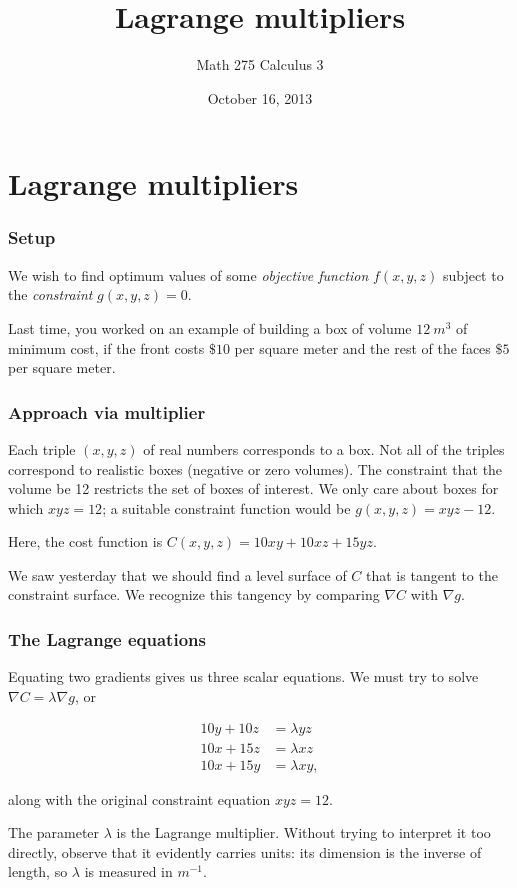 \documentclass[11pt,ignorenonframetext,aspectratio=169,xcolor={svgnames}]{beamer}
\title{Lagrange multipliers}
\author{Math 275 Calculus 3}
\date{October 16, 2013}
\begin{document}
\frame{\titlepage}

\section{Lagrange multipliers}

\begin{frame}\frametitle{Setup}

We wish to find optimum values of some \emph{objective function}
$f(x,y,z)$ subject to the \emph{constraint} $g(x,y,z) = 0$.

Last time, you worked on an example of building a box of volume
$\SI{12}{m^3}$ of minimum cost, if the front costs $\$10$ per square
meter and the rest of the faces $\$5$ per square meter.

\end{frame}

\begin{frame}\frametitle{Approach via multiplier}

Each triple $(x,y,z)$ of real numbers corresponds to a box. Not all of
the triples correspond to realistic boxes (negative or zero volumes).
The constraint that the volume be 12 restricts the set of boxes of
interest. We only care about boxes for which $xyz = 12$; a suitable
constraint function would be $g(x,y,z) = xyz - 12$.

Here, the cost function is $C(x, y, z) = 10xy + 10xz + 15yz$.

We saw yesterday that we should find a level surface of $C$ that is
tangent to the constraint surface. We recognize this tangency by
comparing $\nabla C$ with $\nabla g$.

\end{frame}

\begin{frame}\frametitle{The Lagrange equations}

Equating two gradients gives us three scalar equations. We must try to
solve $\nabla C = \lambda \nabla g$, or

\begin{align*}
    10y + 10z &= \lambda yz \\
    10x + 15z &= \lambda xz \\
    10x + 15y &= \lambda xy,
\end{align*}

along with the original constraint equation $xyz = 12$.

The parameter $\lambda$ is the Lagrange multiplier. Without trying to
interpret it too directly, observe that it evidently carries units: its
dimension is the inverse of length, so $\lambda$ is measured in
$\si{m^{-1}}$.

\end{frame}
\end{document}
